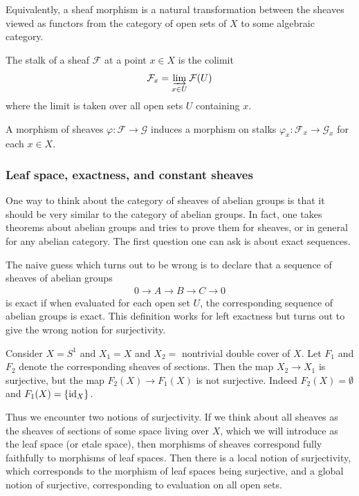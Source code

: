 \documentclass[12pt]{article}
\begin{document}
Equivalently, a sheaf morphism is a natural transformation between the sheaves viewed as functors from the category of open sets of $X$ to some algebraic category.

\begin{definition}
    The stalk of a sheaf $\mathcal{F}$ at a point $x \in X$ is the colimit
    \[
        \mathcal{F}_x = \varinjlim_{x \in U} \mathcal{F}(U)
    \]
    where the limit is taken over all open sets $U$ containing $x$.
\end{definition}
A morphism of sheaves $\varphi: \mathcal{F} \to \mathcal{G}$ induces a morphism on stalks $\varphi_x: \mathcal{F}_x \to \mathcal{G}_x$ for each $x \in X$.

\subsubsection{Leaf space, exactness, and constant sheaves}
One way to think about the category of sheaves of abelian groups is that it should be very similar to the category of abelian groups. In fact, one takes theorems about abelian groups and tries to prove them for sheaves, or in general for any abelian category. The first question one can ask is about exact sequences.

The naive guess which turns out to be wrong is to declare that a sequence of sheaves of abelian groups \begin{align*}
    0 \to A \to B \to C \to 0
\end{align*} is exact if when evaluated for each open set $U$, the corresponding sequence of abelian groups is exact. This definition works for left exactness but turns out to give the wrong notion for surjectivity.

\begin{example}
    Consider $X = S^1$ and $X_1 = X$ and $X_2 = $ nontrivial double cover of $X$. Let $F_1$ and $F_2$ denote the corresponding sheaves of sections. Then the map $X_2 \to X_1$ is surjective, but the map $F_2(X) \to F_1(X)$ is not surjective. Indeed $F_2(X) = \emptyset$ and $F_1(X) = \{\operatorname{id}_X\}$.
\end{example}

Thus we encounter two notions of surjectivity. If we think about all sheaves as the sheaves of sections of some space living over $X$, which we will introduce as the leaf space (or etale space), then morphisms of sheaves correspond fully faithfully to morphisms of leaf spaces. Then there is a local notion of surjectivity, which corresponds to the morphism of leaf spaces being surjective, and a global notion of surjective, corresponding to evaluation on all open sets.
\end{document}
